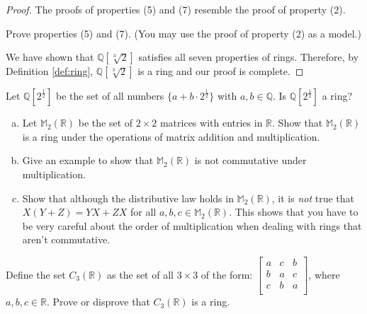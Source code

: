 \begin{example}
\begin{proof}
The proofs of properties (5) and (7) resemble the proof of property (2).

\begin{exercise}\label{exercise:rings:comm/distPropsQcuberoot2}
Prove properties (5) and (7). (You may use the proof of property (2) as a model.)
\end{exercise}{}

We have shown that ${\mathbb Q}[\sqrt[3]{2}]$ satisfies all seven properties of rings. Therefore, by Definition \ref{def:ring}, ${\mathbb Q}[\sqrt[3]{2}]$ is a ring and our proof is complete.
\end{proof}
\end{example}{}

\begin{exercise}\label{exercise:rings:Qsqrt2ring}
Let ${\mathbb Q}[2^{\frac{1}{2}}]$ be the set of all numbers $\{a+b\cdot2^{\frac{1}{2}}\}$ with $a,b\in {\mathbb Q}$. Is ${\mathbb Q}[2^{\frac{1}{2}}]$ a ring?
\end{exercise}

\begin{exercise}\label{exercise:rings:ringMatrices}
\begin{enumerate}[(a)]
\item Let ${\mathbb M}_2({\mathbb R})$ be the set of  $2\times 2$ matrices with entries in ${\mathbb R}$. Show that ${\mathbb M}_2({\mathbb R})$ is a ring under the operations of matrix addition and multiplication.
\item Give an example to show that ${\mathbb M}_2({\mathbb R})$ is not commutative under multiplication.
\item Show that although the distributive law holds in ${\mathbb M}_2({\mathbb R})$, it is \emph{not} true that $X(Y+ Z) = YX + ZX$ for all $a,b,c \in {\mathbb M}_2({\mathbb R})$. This shows that you have to be very careful about the order of multiplication when dealing with rings that aren't commutative.
\end{enumerate}
\end{exercise}{}

\begin{exercise}\label{exercise:rings:circulant_matrices}
Define the set $C_3({\mathbb R})$ as the set of all $3\times3$  of the form:
$\begin{bmatrix}
a & c & b\\
b & a & c\\
c & b & a\\
\end{bmatrix}$,
where $a,b,c\in{\mathbb R}$.  Prove or disprove that $C_3({\mathbb R})$ is a ring.
\end{exercise}

